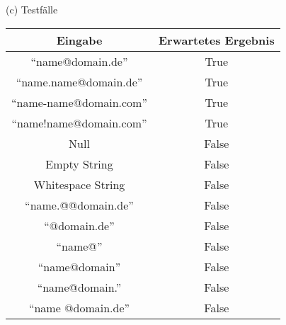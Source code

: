 (c) Testfälle\\
\begin{tabular}{ c | c }
 Eingabe & Erwartetes Ergebnis \\
 \hline
 ``name@domain.de'' & True  \\
 ``name.name@domain.de'' & True  \\
 ``name-name@domain.com'' & True  \\
 ``name!name@domain.com'' & True  \\
 \hline
 Null & False  \\  
 Empty String & False  \\
 Whitespace String & False  \\
 ``name.@@domain.de'' & False \\
 ``@domain.de'' & False \\
 ``name@'' & False \\
 ``name@domain'' & False \\
 ``name@domain.'' & False \\
 ``name @domain.de'' & False \\
\end{tabular}

